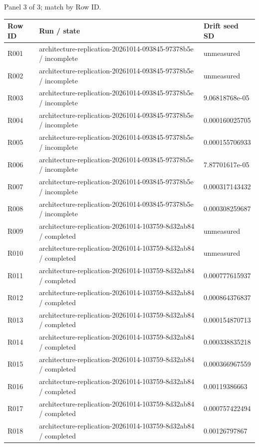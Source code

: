 \documentclass[10pt]{article}
\begin{document}
\par\noindent Panel 3 of 3; match by Row ID.
{\scriptsize\setlength{\tabcolsep}{2pt}
\begin{longtable}{p{}p{}p{}}
Row ID & Run / state & Drift seed SD \\
\hline\endhead
R001 & architecture-replication-20261014-093845-97378b5e / incomplete & unmeasured \\
R002 & architecture-replication-20261014-093845-97378b5e / incomplete & unmeasured \\
R003 & architecture-replication-20261014-093845-97378b5e / incomplete & 9.06818768e-05 \\
R004 & architecture-replication-20261014-093845-97378b5e / incomplete & 0.000160025705 \\
R005 & architecture-replication-20261014-093845-97378b5e / incomplete & 0.000155706933 \\
R006 & architecture-replication-20261014-093845-97378b5e / incomplete & 7.87701617e-05 \\
R007 & architecture-replication-20261014-093845-97378b5e / incomplete & 0.000317143432 \\
R008 & architecture-replication-20261014-093845-97378b5e / incomplete & 0.000308259687 \\
R009 & architecture-replication-20261014-103759-8d32ab84 / completed & unmeasured \\
R010 & architecture-replication-20261014-103759-8d32ab84 / completed & unmeasured \\
R011 & architecture-replication-20261014-103759-8d32ab84 / completed & 0.000777615937 \\
R012 & architecture-replication-20261014-103759-8d32ab84 / completed & 0.000864376837 \\
R013 & architecture-replication-20261014-103759-8d32ab84 / completed & 0.000154870713 \\
R014 & architecture-replication-20261014-103759-8d32ab84 / completed & 0.000338835218 \\
R015 & architecture-replication-20261014-103759-8d32ab84 / completed & 0.000366967559 \\
R016 & architecture-replication-20261014-103759-8d32ab84 / completed & 0.00119386663 \\
R017 & architecture-replication-20261014-103759-8d32ab84 / completed & 0.000757422494 \\
R018 & architecture-replication-20261014-103759-8d32ab84 / completed & 0.00126797867 \\
\end{longtable}}
\end{document}
